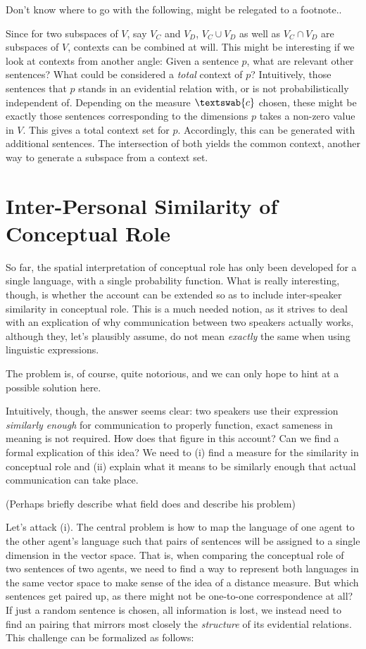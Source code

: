 \documentclass[11pt, a4paper]{scrartcl}
\renewcommand{\i}[1]{\emph{#1}}
\newcommand{\m}[1]{\textswab{#1}}
\begin{document}
Don't know where to go with the following, might be relegated to a footnote..

Since for two subspaces of $V$, say $V_C$ and $V_D$, $V_C \cup V_D$ as well as $V_C \cap V_D$ are subspaces of $V$, contexts can be combined at will. This might be interesting if we look at contexts from another angle: Given a sentence $p$, what are relevant other sentences? What could be considered a \i{total} context of $p$? Intuitively, those sentences that $p$ stands in an evidential relation with, or is not probabilistically independent of. Depending on the measure $\m{c}$ chosen, these might be exactly those sentences corresponding to the dimensions $p$ takes a non-zero value in $V$. This gives a total context set for $p$. Accordingly, this can be generated with additional sentences. The intersection of both yields the common context, another way to generate a subspace from a context set. 



\section{Inter-Personal Similarity of Conceptual Role}

So far, the spatial interpretation of conceptual role has only been developed for a single language, with a single probability function. What is really interesting, though, is whether the account can be extended so as to include inter-speaker similarity in conceptual role. This is a much needed notion, as it strives to deal with an explication of why communication between two speakers actually works, although they, let's plausibly assume, do not mean \i{exactly} the same when using linguistic expressions. 

The problem is, of course, quite notorious, and we can only hope to hint at a possible solution here.

Intuitively, though, the answer seems clear: two speakers use their expression \i{similarly enough} for communication to properly function, exact sameness in meaning is not required. How does that figure in this account? Can we find a formal explication of this idea? We need to (i) find a measure for the similarity in conceptual role and (ii) explain what it means to be similarly enough that actual communication can take place.


{\color{red} (Perhaps briefly describe what field does and describe his problem)}

Let's attack (i). The central problem is how to map the language of one agent to the other agent's language such that pairs of sentences will be assigned to a single dimension in the vector space. That is, when comparing the conceptual role of two sentences of two agents, we need to find a way to represent both languages in the same vector space to make sense of the idea of a distance measure. But which sentences get paired up, as there might not be one-to-one correspondence at all? If just a random sentence is chosen, all information is lost, we instead need to find an pairing that mirrors most closely the \i{structure} of its evidential relations. This challenge can be formalized as follows:
\end{document}
